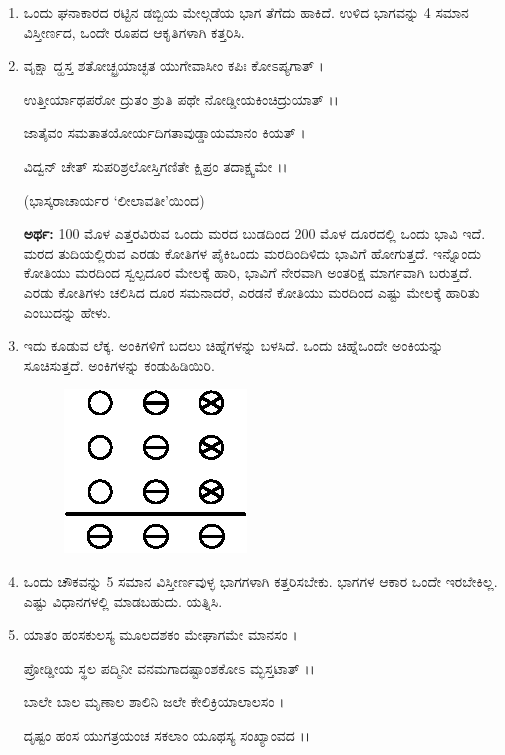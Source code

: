 \begin{enumerate}
\item ಒಂದು ಘನಾಕಾರದ ರಟ್ಟಿನ ಡಬ್ಬಿಯ ಮೇಲ್ಗಡೆಯ ಭಾಗ ತೆಗೆದು ಹಾಕಿದೆ. ಉಳಿದ ಭಾಗವನ್ನು 4 ಸಮಾನ ವಿಸ್ತೀರ್ಣದ, ಒಂದೇ ರೂಪದ ಆಕೃತಿಗಳಾಗಿ ಕತ್ತರಿಸಿ. 

\item ವೃಕ್ಷಾ ದ್ಹಸ್ತ ಶತೋಚ್ಛ್ರಯಾಚ್ಛತ ಯುಗೇವಾಸೀಂ ಕಪಿಃ ಕೋಽಪ್ಯಗಾತ್ ।

ಉತ್ತೀರ್ಯಾಥಪರೋ ದ್ರುತಂ ಶ್ರುತಿ ಪಥೇ ನೋಡ್ಡೀಯಕಿಂಚಿದ್ರುಯಾತ್ ।।

ಜಾತೈವಂ ಸಮತಾತಯೋರ್ಯದಿಗತಾವುಡ್ಡಾಯಮಾನಂ ಕಿಯತ್ ।

ವಿದ್ವನ್ ಚೇತ್ ಸುಪರಿಶ್ರಲೋಸ್ತಿಗಣಿತೇ ಕ್ಷಿಪ್ರಂ ತದಾಕ್ಷ್ವಮೇ ।।

\smallskip

\hfill (ಭಾಸ್ಕರಾಚಾರ್ಯರ `ಲೀಲಾವತೀ'ಯಿಂದ)

\smallskip

{\bf ಅರ್ಥ:}  100 ಮೊಳ ಎತ್ತರವಿರುವ ಒಂದು ಮರದ ಬುಡದಿಂದ 200  ಮೊಳ ದೂರದಲ್ಲಿ ಒಂದು ಭಾವಿ ಇದೆ. ಮರದ ತುದಿಯಲ್ಲಿರುವ ಎರಡು ಕೋತಿಗಳ ಪೈಕಿ\break ಒಂದು ಮರದಿಂದಿಳಿದು ಭಾವಿಗೆ ಹೋಗುತ್ತದೆ. ಇನ್ನೊಂದು ಕೋತಿಯು ಮರದಿಂದ ಸ್ವಲ್ಪದೂರ ಮೇಲಕ್ಕೆ ಹಾರಿ, ಭಾವಿಗೆ ನೇರವಾಗಿ ಅಂತರಿಕ್ಷ ಮಾರ್ಗವಾಗಿ ಬರುತ್ತದೆ. ಎರಡು ಕೋತಿಗಳು ಚಲಿಸಿದ ದೂರ ಸಮನಾದರೆ, ಎರಡನೆ ಕೋತಿಯು ಮರದಿಂದ ಎಷ್ಟು ಮೇಲಕ್ಕೆ ಹಾರಿತು ಎಂಬುದನ್ನು ಹೇಳು. 

\item ಇದು ಕೂಡುವ ಲೆಕ್ಕ. ಅಂಕಿಗಳಿಗೆ ಬದಲು ಚಿಹ್ನೆಗಳನ್ನು ಬಳಸಿದೆ. ಒಂದು ಚಿಹ್ನೆ\break ಒಂದೇ ಅಂಕಿಯನ್ನು ಸೂಚಿಸುತ್ತದೆ. ಅಂಕಿಗಳನ್ನು ಕಂಡುಹಿಡಿಯಿರಿ. 
\begin{figure}[H]
\centering
\includegraphics{images/chap12/q24.eps}
\end{figure}


\item ಒಂದು ಚೌಕವನ್ನು 5 ಸಮಾನ ವಿಸ್ತೀರ್ಣವುಳ್ಳ ಭಾಗಗಳಾಗಿ ಕತ್ತರಿಸಬೇಕು. ಭಾಗಗಳ ಆಕಾರ ಒಂದೇ ಇರಬೇಕಿಲ್ಲ. ಎಷ್ಟು ವಿಧಾನಗಳಲ್ಲಿ ಮಾಡಬಹುದು. ಯತ್ನಿಸಿ.  

\item ಯಾತಂ ಹಂಸಕುಲಸ್ಯ ಮೂಲದಶಕಂ ಮೇಘಾಗಮೇ ಮಾನಸಂ ।

ಪ್ರೋಡ್ಡೀಯ ಸ್ಥಲ ಪದ್ಮಿನೀ ವನಮಗಾದಷ್ಟಾಂಶಕೋಽ ಮ್ಭಸ್ತಟಾತ್ ।।

ಬಾಲೇ ಬಾಲ ಮೃಣಾಲ ಶಾಲಿನಿ ಜಲೇ ಕೇಲಿಕ್ರಿಯಾಲಾಲಸಂ ।

ದೃಷ್ಟಂ ಹಂಸ ಯುಗತ್ರಯಂಚ ಸಕಲಾಂ ಯೂಥಸ್ಯ ಸಂಖ್ಯಾಂವದ ।।


\end{enumerate}
